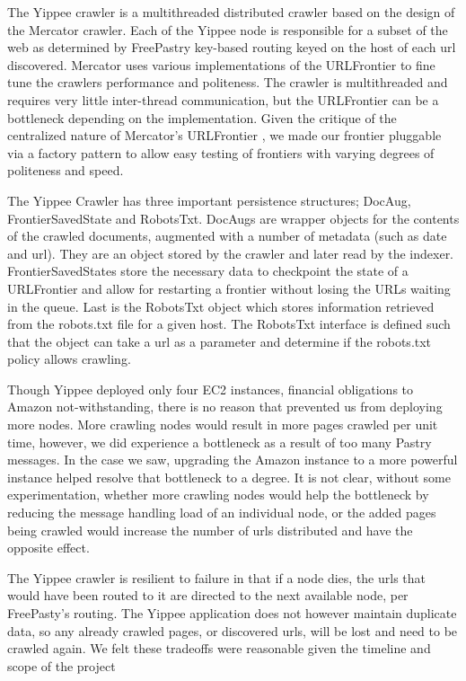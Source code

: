 \documentclass[11pt, letterpaper, oneside, twocolumn]{article}
\begin{document}
The Yippee crawler is a multithreaded distributed crawler based on the design of the Mercator crawler\cite{mercator}. 
Each of the Yippee node is responsible for a subset of the web as determined by FreePastry key-based routing keyed on the host of each url discovered.
Mercator uses various implementations of the URLFrontier to fine tune the crawlers performance and politeness.
The crawler is multithreaded and requires very little inter-thread communication, but the URLFrontier can be a bottleneck depending on the implementation. 
Given the critique of the centralized nature of Mercator's URLFrontier \cite{ubi, para}, we made our frontier pluggable via a factory pattern to allow easy testing of frontiers with varying degrees of politeness and speed.

The Yippee Crawler has three important persistence structures; DocAug, FrontierSavedState and RobotsTxt.
DocAugs are wrapper objects for the contents of the crawled documents, augmented with a number of metadata (such as date and url).
They are an object stored by the crawler and later read by the indexer.
FrontierSavedStates store the necessary data to checkpoint the state of a URLFrontier and allow for restarting a frontier without losing the URLs waiting in the queue.
Last is the RobotsTxt object which stores information retrieved from the robots.txt file for a given host.
The RobotsTxt interface is defined such that the object can take a url as a parameter and determine if the robots.txt policy allows crawling.

Though Yippee deployed only four EC2 instances, financial obligations to Amazon not-withstanding, there is no reason that prevented us from deploying more nodes.
More crawling nodes would result in more pages crawled per unit time, however, we did experience a bottleneck as a result of too many Pastry messages.
In the case we saw, upgrading the Amazon instance to a more powerful instance helped resolve that bottleneck to a degree.
It is not clear, without some experimentation, whether more crawling nodes would help the bottleneck by reducing the message handling load of an individual node, or the added pages being crawled would increase the number of urls distributed and have the opposite effect.

The Yippee crawler is resilient to failure in that if a node dies, the urls that would have been routed to it are directed to the next available node, per FreePasty's routing.
The Yippee application does not however maintain duplicate data, so any already crawled pages, or discovered urls, will be lost and need to be crawled again.
We felt these tradeoffs were reasonable given the timeline and scope of the project
\end{document}
